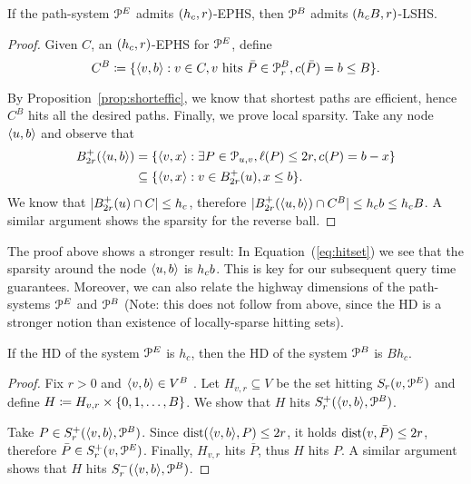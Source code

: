 \begin{proposition}
If the path-system $\mathcal{P}^E$ admits $(h_c,r)$-EPHS, then $\mathcal{P}^B$ admits $(h_c B,r)$-LSHS.
\end{proposition}
\begin{proof}
Given $C$, an $(h_c,r)$-EPHS for $\mathcal{P}^E$, define
\begin{equation}\label{eq:hitset}
C^B\coloneqq \{\langle v,b\rangle: v\in C, v \text{ hits }\bar P\in\mathcal{P}_r^B, c(\bar P)=b\leq B \}.
\end{equation}

By Proposition~\ref{prop:shorteffic}, we know that shortest paths are efficient, hence $C^B$ hits all the desired paths.
Finally, we prove local sparsity.
Take any node $\langle u,b\rangle$ and observe that
\begin{align*}
B^+_{2r}(\langle u,b\rangle) &= \{\langle v,x\rangle: \exists P\in\mathcal{P}_{u,v}, \ell(P)\leq 2r, c(P)=b-x\} \\
&\subseteq \{\langle v,x\rangle: v\in B^+_{2r}(u), x\leq b\} .
\end{align*}
We know that $\lvert B^+_{2r}(u)\cap C\rvert\leq h_c$, therefore $\lvert B^+_{2r}(\langle u,b\rangle)\cap C^B\rvert\leq h_c b\leq h_c B$.
A similar argument shows the sparsity for the reverse ball.
\end{proof}

The proof above shows a stronger result:
In Equation~(\eqref{eq:hitset}) we see that the sparsity around the node $\langle u,b\rangle$ is $h_c b$.
This is key for our subsequent query time guarantees.
Moreover, we can also relate the highway dimensions of the path-systems $\mathcal{P}^E$ and $\mathcal{P}^B$ (Note: this does not follow from above, since the HD is a stronger notion than existence of locally-sparse hitting sets).
\begin{proposition}\label{prop:HDaugmented}
If the HD of the system $\mathcal{P}^E$ is $h_c$, then the HD of the system $\mathcal{P}^B$ is $Bh_c$.
\end{proposition}
\begin{proof}
Fix $r>0$ and $\langle v,b\rangle\in V^B$ .
Let $H_{v,r}\subseteq V$ be the set hitting $S_r(v,\mathcal{P}^E)$ and define $H\coloneqq H_{v,r}\times\{0,1,\ldots,B\}$.
We show that $H$ hits $S^+_r(\langle v,b\rangle,\mathcal{P}^B)$.

Take $P\in S^+_r(\langle v,b\rangle,\mathcal{P}^B)$.
Since $\text{dist}(\langle v,b\rangle,P)\leq 2r$, it holds $\text{dist}(v,\bar P)\leq 2r$, therefore $\bar P\in S^+_r(v,\mathcal{P}^E)$.
Finally, $H_{v,r}$ hits $\bar P$, thus $H$ hits $P$.
A similar argument shows that $H$ hits $S^-_r(\langle v,b\rangle,\mathcal{P}^B)$.
\end{proof}

